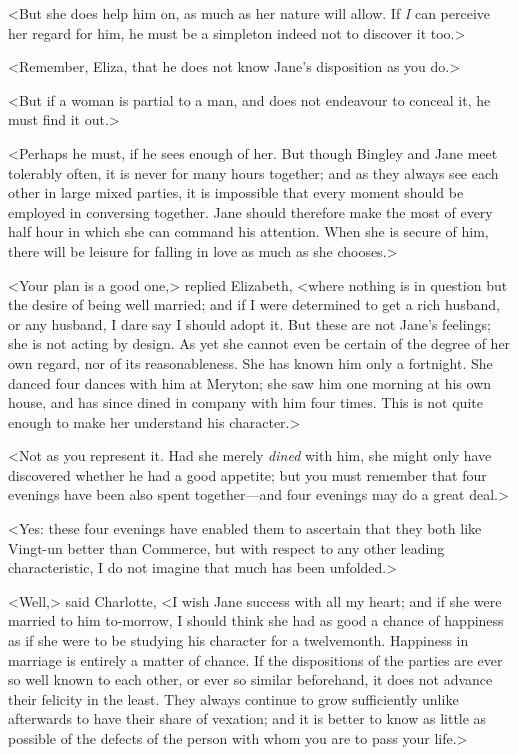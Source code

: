 <But she does help him on, as much as her nature will allow. If \textit{I} can perceive her regard for him, he must be a simpleton indeed not to discover it too.>

<Remember, Eliza, that he does not know Jane's disposition as you do.>

<But if a woman is partial to a man, and does not endeavour to conceal it, he must find it out.>

<Perhaps he must, if he sees enough of her. But though Bingley and Jane meet tolerably often, it is never for many hours together; and as they always see each other in large mixed parties, it is impossible that every moment should be employed in conversing together. Jane should therefore make the most of every half hour in which she can command his attention. When she is secure of him, there will be leisure for falling in love as much as she chooses.>

<Your plan is a good one,> replied Elizabeth, <where nothing is in question but the desire of being well married; and if I were determined to get a rich husband, or any husband, I dare say I should adopt it. But these are not Jane's feelings; she is not acting by design. As yet she cannot even be certain of the degree of her own regard, nor of its reasonableness. She has known him only a fortnight. She danced four dances with him at Meryton; she saw him one morning at his own house, and has since dined in company with him four times. This is not quite enough to make her understand his character.>

<Not as you represent it. Had she merely \textit{dined} with him, she might only have discovered whether he had a good appetite; but you must remember that four evenings have been also spent to\-geth\-er—and four evenings may do a great deal.>

<Yes: these four evenings have enabled them to ascertain that they both like Vingt-un better than Commerce, but with respect to any other leading characteristic, I do not imagine that much has been unfolded.>

<Well,> said Charlotte, <I wish Jane success with all my heart; and if she were married to him to-morrow, I should think she had as good a chance of happiness as if she were to be studying his character for a twelvemonth. Happiness in marriage is entirely a matter of chance. If the dispositions of the parties are ever so well known to each other, or ever so similar beforehand, it does not advance their felicity in the least. They always continue to grow sufficiently unlike afterwards to have their share of vexation; and it is better to know as little as possible of the defects of the person with whom you are to pass your life.>

